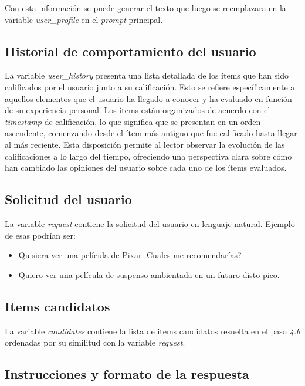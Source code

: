 \documentclass[11pt,a4paper,twoside]{thesis}
\begin{document}
Con esta información se puede generar el texto que luego se reemplazara en la variable \textit{user\_profile} en el \textit{prompt} principal.

\subsection{Historial de comportamiento del usuario}

La variable \textit{user\_history} presenta una lista detallada de los ítems que han sido calificados por el usuario junto a su calificación. Esto se refiere específicamente a aquellos elementos que el usuario ha llegado a conocer y ha evaluado en función de su experiencia personal. Los ítems están organizados de acuerdo con el \textit{timestamp} de calificación, lo que significa que se presentan en un orden ascendente, comenzando desde el ítem más antiguo que fue calificado hasta llegar al más reciente. Esta disposición permite al lector observar la evolución de las calificaciones a lo largo del tiempo, ofreciendo una perspectiva clara sobre cómo han cambiado las opiniones del usuario sobre cada uno de los ítems evaluados.

\subsection{Solicitud del usuario}

La variable \textit{request} contiene la solicitud del usuario en lenguaje natural. Ejemplo de esas podrían ser:

\begin{itemize}
	\item Quisiera ver una película de Pixar. Cuales me recomendarías?
	\item Quiero ver una película de suspenso ambientada en un futuro disto-pico.
\end{itemize}
\subsection{Items candidatos}

La variable \textit{candidates} contiene la lista de items candidatos resuelta en el paso \textit{4.b} ordenadas por su similitud con la variable \textit{request}.

\subsection{Instrucciones y formato de la respuesta}
\end{document}
